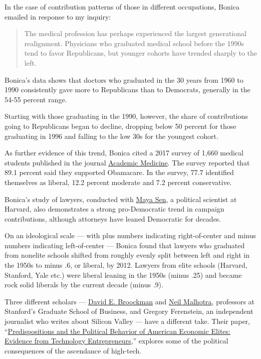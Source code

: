 In the case of contribution patterns of those in different occupations,
Bonica emailed in response to my inquiry:

\begin{quote}
The medical profession has perhaps experienced the largest generational
realignment. Physicians who graduated medical school before the 1990s
tend to favor Republicans, but younger cohorts have trended sharply to
the left.
\end{quote}

Bonica's data shows that doctors who graduated in the 30 years from 1960
to 1990 consistently gave more to Republicans than to Democrats,
generally in the 54-55 percent range.

Starting with those graduating in the 1990, however, the share of
contributions going to Republicans began to decline, dropping below 50
percent for those graduating in 1996 and falling to the low 30s for the
youngest cohort.

As further evidence of this trend, Bonica cited a 2017 survey of 1,660
medical students published in the journal
\href{https://journals.lww.com/academicmedicine/Fulltext/2019/09000/Looking_to_the_Future__Medical_Students__Views_on.31.aspx?casa_token=2x2FBy3QFVsAAAAA:RSTId-aUSYb0UkBscoLt9UTcx-UjUFORxL40UIIsWE3brErjCF5ku_eq5QVzSZXXsJRtkvdFN_giZ9UiZf6boyQa\#pdf-link}{Academic
Medicine}. The survey reported that 89.1 percent said they supported
Obamacare. In the survey, 77.7 identified themselves as liberal, 12.2
percent moderate and 7.2 percent conservative.

Bonica's study of lawyers, conducted with
\href{https://scholar.harvard.edu/msen/home}{Maya Sen}, a political
scientist at Harvard, also demonstrates a strong pro-Democratic trend in
campaign contributions, although attorneys have leaned Democratic for
decades.

On an ideological scale --- with plus numbers indicating right-of-center
and minus numbers indicating left-of-center --- Bonica found that
lawyers who graduated from nonelite schools shifted from roughly evenly
split between left and right in the 1950s to minus .6, or liberal, by
2012. Lawyers from elite schools (Harvard, Stanford, Yale etc.) were
liberal leaning in the 1950s (minus .25) and became rock solid liberals
by the current decade (minus .9).

Three different scholars ---
\href{https://dbroock.people.stanford.edu/}{David E. Broockman} and
\href{https://web.stanford.edu/~neilm/}{Neil Malhotra}, professors at
Stanford's Graduate School of Business, and Gregory Ferenstein, an
independent journalist who writes about Silicon Valley --- have a
different take. Their paper,
``\href{https://onlinelibrary.wiley.com/doi/epdf/10.1111/ajps.12408}{Predispositions
and the Political Behavior of American Economic Elites: Evidence from
Technology Entrepreneurs},'' explores some of the political consequences
of the ascendance of high-tech.


